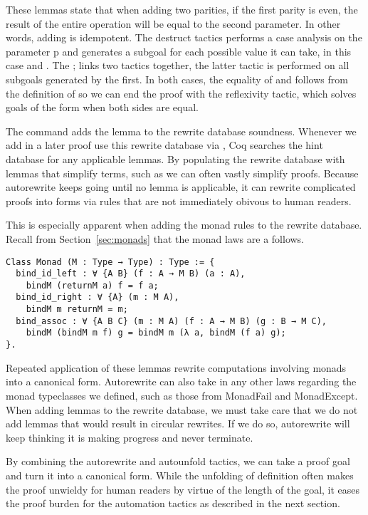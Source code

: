 These lemmas state that when adding two parities, if the first parity is even,
the result of the entire operation will be equal to the second parameter. In
other words, adding  is idempotent. The destruct tactics
performs a case analysis on the parameter p and generates a subgoal for each
possible value it can take, in this case  and .
The ; links two tactics together, the latter tactic is performed on all
subgoals generated by the first. In both cases, the equality of
 and  follows from the definition of
 so we can end the proof with the reflexivity tactic, which
solves goals of the form \coq{_ = _ } when both sides are equal.

The command  adds the lemma to the rewrite database
soundness. Whenever we add in a later proof use this rewrite database via
, Coq searches the hint database for any
applicable lemmas. By populating the rewrite database with lemmas that simplify
terms, such as  we can often vastly simplify proofs.
Because autorewrite keeps going until no lemma is applicable, it can rewrite
complicated proofs into forms via rules that are not immediately obivous to
human readers.

This is especially apparent when adding the monad rules to the rewrite
database. Recall from Section~\ref{sec:monads} that the monad laws are a
follows.
\begin{verbatim}
Class Monad (M : Type → Type) : Type := {
  bind_id_left : ∀ {A B} (f : A → M B) (a : A), 
    bindM (returnM a) f = f a;
  bind_id_right : ∀ {A} (m : M A),
    bindM m returnM = m;
  bind_assoc : ∀ {A B C} (m : M A) (f : A → M B) (g : B → M C),
    bindM (bindM m f) g = bindM m (λ a, bindM (f a) g);
}.
\end{verbatim}

Repeated application of these lemmas rewrite computations involving monads into
a canonical form. Autorewrite can also take in any other laws regarding the
monad typeclasses we defined, such as those from MonadFail and MonadExcept.
When adding lemmas to the rewrite database, we must take care that we do not
add lemmas that would result in circular rewrites. If we do so, autorewrite
will keep thinking it is making progress and never terminate.

By combining the autorewrite and autounfold tactics, we can take a proof goal
and turn it into a canonical form. While the unfolding of definition often
makes the proof unwieldy for human readers by virtue of the length of the goal,
it eases the proof burden for the automation tactics as described in the next
section.

